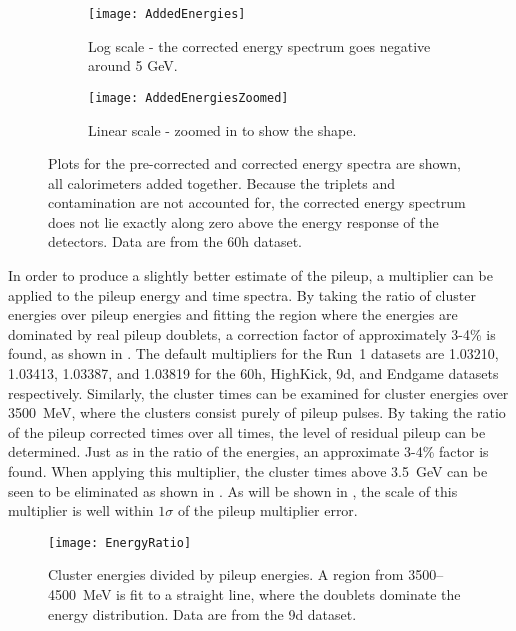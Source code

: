     \begin{figure}
    \centering
        \begin{subfigure}[]{0.45\textwidth}
            \centering
            \texttt{[image: AddedEnergies]}
            \caption{Log scale - the corrected energy spectrum goes negative around 5 GeV.}
        \end{subfigure}%
        \hspace{1cm}
        \begin{subfigure}[]{0.45\textwidth}
            \centering
            \texttt{[image: AddedEnergiesZoomed]}
            \caption{Linear scale - zoomed in to show the shape.}
        \end{subfigure}
    \caption[Non-corrected and pileup corrected cluster energies]{Plots for the pre-corrected and corrected energy spectra are shown, all calorimeters added together. Because the triplets and contamination are not accounted for, the corrected energy spectrum does not lie exactly along zero above the energy response of the detectors. Data are from the 60h dataset.}
    \label{fig:AddedEnergies}
    \end{figure}



In order to produce a slightly better estimate of the pileup, a multiplier can be applied to the pileup energy and time spectra. By taking the ratio of cluster energies over pileup energies and fitting the region where the energies are dominated by real pileup doublets, a correction factor of approximately 3-4\% is found, as shown in . The default multipliers for the Run~1 datasets are 1.03210, 1.03413, 1.03387, and 1.03819 for the 60h, HighKick, 9d, and Endgame datasets respectively. Similarly, the cluster times can be examined for cluster energies over \SI{3500}{\MeV}, where the clusters consist purely of pileup pulses. By taking the ratio of the pileup corrected times over all times, the level of residual pileup can be determined. Just as in the ratio of the energies, an approximate 3-4\% factor is found. When applying this multiplier, the cluster times above \SI{3.5}{\GeV} can be seen to be eliminated as shown in . As will be shown in , the scale of this multiplier is well within $1\sigma$ of the pileup multiplier error.


    \begin{figure}[H]
        \centering
        \texttt{[image: EnergyRatio]}
        \caption[Cluster energies divided by pileup energies]{Cluster energies divided by pileup energies. A region from \SI{3500}{}--\SI{4500}{\MeV} is fit to a straight line, where the doublets dominate the energy distribution. Data are from the 9d dataset.}
        \label{fig:EnergyRatio}
    \end{figure}


